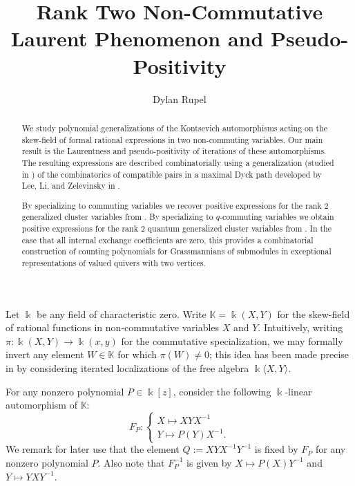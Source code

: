 \documentclass{amsart}
\title{Rank Two Non-Commutative Laurent Phenomenon and Pseudo-Positivity}
\author{Dylan Rupel}
\newcommand{\kk}{\Bbbk}
\newcommand{\KK}{\mathbb{K}}
\begin{document}
 \begin{abstract}
  We study polynomial generalizations of the Kontsevich automorphisms acting on the skew-field of formal rational expressions in two non-commuting variables.  Our main result is the Laurentness and pseudo-positivity of iterations of these automorphisms.  The resulting expressions are described combinatorially using a generalization (studied in \cite{rupel2}) of the combinatorics of compatible pairs in a maximal Dyck path developed by Lee, Li, and Zelevinsky in \cite{lee-li-zelevinsky}.  

  By specializing to commuting variables we recover positive expressions for the rank 2 generalized cluster variables from \cite{rupel2}.  By specializing to $q$-commuting variables we obtain positive expressions for the rank 2 quantum generalized cluster variables from \cite{igusa-rupel-todorov}.  In the case that all internal exchange coefficients are zero, this provides a combinatorial construction of counting polynomials for Grassmannians of submodules in exceptional representations of valued quivers with two vertices.
 \end{abstract}
 \maketitle


\setcounter{section}{1}

Let $\kk$ be any field of characteristic zero.  Write $\KK=\kk(X,Y)$ for the skew-field of rational functions in non-commutative variables $X$ and $Y$.  Intuitively, writing $\pi:\kk(X,Y)\to\kk(x,y)$ for the commutative specialization, we may formally invert any element $W\in\KK$ for which $\pi(W)\ne0$; this idea has been made precise in \cite{usnich1} by considering iterated localizations of the free algebra $\kk\langle X,Y\rangle$.

For any nonzero polynomial $P\in\kk[z]$, consider the following $\kk$-linear automorphism of $\KK$:
\[F_P:\begin{cases} X\mapsto XYX^{-1}\\ Y\mapsto P(Y)X^{-1}.\end{cases}\]
We remark for later use that the element $Q:=XYX^{-1}Y^{-1}$ is fixed by $F_P$ for any nonzero polynomial $P$.  Also note that $F_P^{-1}$ is given by $X\mapsto P(X)Y^{-1}$ and $Y\mapsto YXY^{-1}$.
\end{document}
